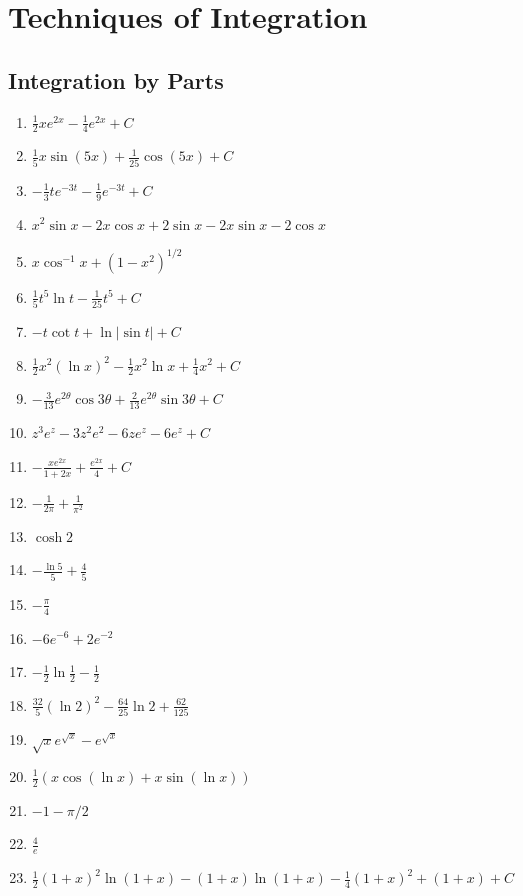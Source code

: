 \documentclass{article} \usepackage[margin=1in]{geometry}
\begin{document}
\section{Techniques of Integration}
\subsection{Integration by Parts}
\begin{enumerate}
	\item $\frac{1}{2}xe^{2x}-\frac{1}{4}e^{2x}+C$
	      \setcounter{enumi}{2}
	\item $\frac{1}{5}x\sin(5x)+\frac{1}{25}\cos(5x)+C$
	      \setcounter{enumi}{4}
	\item $-\frac{1}{3}te^{-3t}-\frac{1}{9}e^{-3t}+C$
	      \setcounter{enumi}{6}
	\item $x^2\sin{x}-2x\cos{x}+2\sin x-2x\sin x-2\cos x$
	      \setcounter{enumi}{8}
	\item $x\cos^{-1}x+(1-x^2)^{1/2}$
	      \setcounter{enumi}{10}
	\item $\frac{1}{5}t^5\ln{t}-\frac{1}{25}t^5+C$
	      \setcounter{enumi}{12}
	\item $-t\cot{t}+\ln|\sin t|+C$
	      \setcounter{enumi}{14}
	\item $\frac{1}{2}x^2(\ln x)^2-\frac{1}{2}x^2\ln x+\frac{1}{4}x^2+C$
	      \setcounter{enumi}{16}
	\item $-\frac{3}{13}e^{2\theta}\cos{3\theta}+\frac{2}{13}e^{2\theta}\sin{3\theta}+C$
	      \setcounter{enumi}{18}
	\item $z^3e^z-3z^2e^2-6ze^z-6e^z+C$
	      \setcounter{enumi}{20}
	\item $-\frac{xe^{2x}}{1+2x}+\frac{e^{2x}}{4}+C$
	      \setcounter{enumi}{22}
	\item $-\frac{1}{2\pi}+\frac{1}{\pi^2}$
	      \setcounter{enumi}{24}
	\item $\cosh2$
	      \setcounter{enumi}{26}
	\item $-\frac{\ln5}{5}+\frac{4}{5}$
	      \setcounter{enumi}{28}
	\item  $-\frac{\pi}{4}$
	      \setcounter{enumi}{30}
	\item $-6e^{-6}+2e^{-2}$
	      \setcounter{enumi}{32}
	\item $-\frac{1}{2}\ln\frac{1}{2}-\frac{1}{2}$
	      \setcounter{enumi}{34}
	\item $\frac{32}{5}(\ln2)^2-\frac{64}{25}\ln2+\frac{62}{125}$
	      \setcounter{enumi}{36}
	\item $\sqrt{x}e^{\sqrt{x}}-e^\sqrt{x}$
	\item $\frac{1}{2}(x\cos(\ln x)+x\sin(\ln x))$
	\item $-1-\pi/2$
	\item $\frac{4}{e}$
	\item $\frac{1}{2}(1+x)^2\ln(1+x)-(1+x)\ln(1+x)-\frac{1}{4}(1+x)^2+(1+x)+C$
\end{enumerate}
\end{document}

